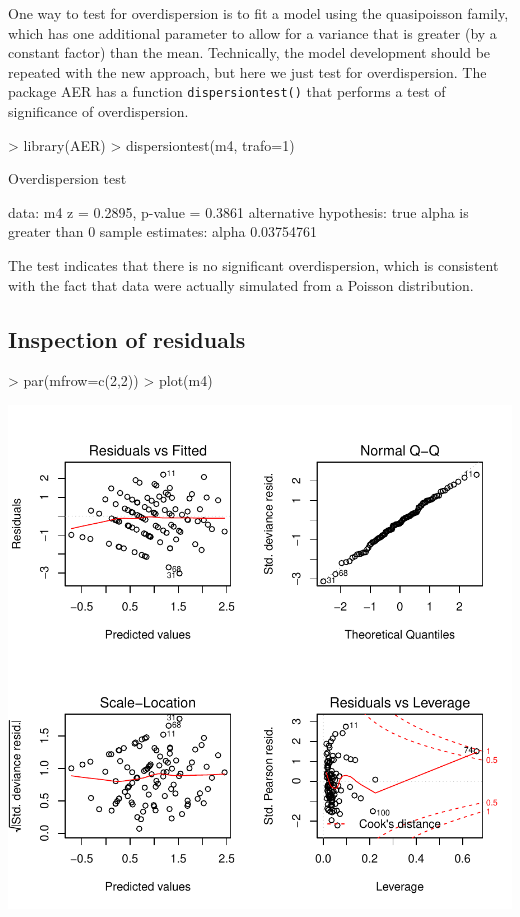 \documentclass{article}
\begin{document}
One way to test for overdispersion is to fit a model using the quasipoisson family, which has one additional parameter to allow for a variance that is greater (by a constant factor) than the mean. Technically, the model development should be repeated with the new approach, but here we just test for overdispersion. The package AER has a function \verb!dispersiontest()! that performs a test of significance of overdispersion.
\begin{Schunk}
\begin{Sinput}
> library(AER)
> dispersiontest(m4, trafo=1)
\end{Sinput}
\begin{Soutput}
	Overdispersion test

data:  m4
z = 0.2895, p-value = 0.3861
alternative hypothesis: true alpha is greater than 0
sample estimates:
     alpha 
0.03754761 
\end{Soutput}
\end{Schunk}

The test indicates that there is no significant overdispersion, which is consistent with the fact that data were actually simulated from a Poisson distribution.

\subsection{Inspection of residuals}

\begin{Schunk}
\begin{Sinput}
> par(mfrow=c(2,2))
> plot(m4)
\end{Sinput}
\end{Schunk}
\includegraphics{HW07PLS206F14-008}
\end{document}
